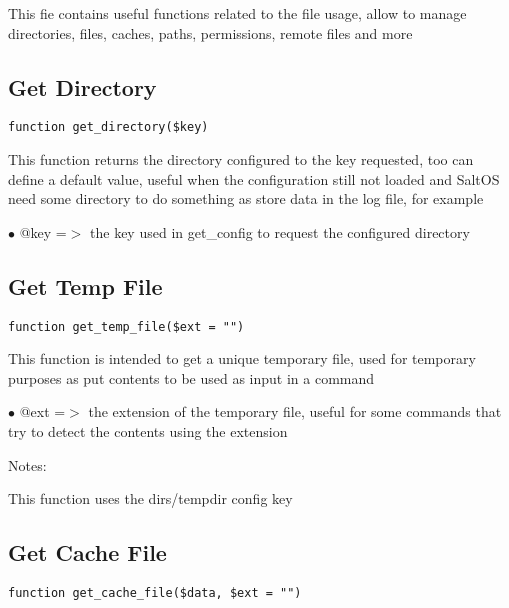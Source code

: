 \documentclass[a4paper]{book}
\begin{document}
This fie contains useful functions related to the file usage, allow to manage directories, files,
caches, paths, permissions, remote files and more

\hypertarget{toc120}{}
\subsection{Get Directory}

\begin{lstlisting}
function get_directory($key)
\end{lstlisting}

This function returns the directory configured to the key requested, too can define a default
value, useful when the configuration still not loaded and SaltOS need some directory to do
something as store data in the log file, for example

\begin{compactitem}
\item[\color{myblue}$\bullet$] @key =$>$ the key used in get\_config to request the configured directory
\end{compactitem}

\hypertarget{toc121}{}
\subsection{Get Temp File}

\begin{lstlisting}
function get_temp_file($ext = "")
\end{lstlisting}

This function is intended to get a unique temporary file, used for temporary
purposes as put contents to be used as input in a command

\begin{compactitem}
\item[\color{myblue}$\bullet$] @ext =$>$ the extension of the temporary file, useful for some commands that
        try to detect the contents using the extension
\end{compactitem}

Notes:

This function uses the dirs/tempdir config key

\hypertarget{toc122}{}
\subsection{Get Cache File}

\begin{lstlisting}
function get_cache_file($data, $ext = "")
\end{lstlisting}
\end{document}
